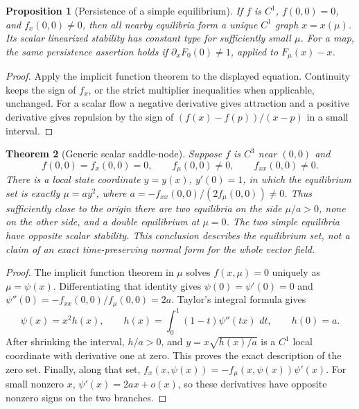\documentclass[11pt,oneside]{book}
\newtheorem{theorem}{Theorem}[chapter]
\newtheorem{proposition}[theorem]{Proposition}
\theoremstyle{definition}
\theoremstyle{remark}\newtheorem{remark}[theorem]{Remark}
\newcommand{\dd}{\,d}\newcommand{\id}{\operatorname{id}}
\begin{document}
\begin{proposition}[Persistence of a simple equilibrium]\label{d13:16:simple-persistence}
If \(f\) is \(C^1\), \(f(0,0)=0\), and \(f_x(0,0)\neq0\), then all nearby
equilibria form a unique \(C^1\) graph \(x=x(\mu)\). Its scalar
linearized stability has constant type for sufficiently small \(\mu\).
For a map, the same persistence assertion holds if
\(\partial_xF_0(0)\neq1\), applied to \(F_\mu(x)-x\).
\end{proposition}
\begin{proof}
Apply the implicit function theorem to the displayed equation.
Continuity keeps the sign of \(f_x\), or the strict multiplier inequalities
when applicable, unchanged. For a scalar flow a negative derivative gives
attraction and a positive derivative gives repulsion by the sign of
\((f(x)-f(p))/(x-p)\) in a small interval.
\end{proof}

\begin{theorem}[Generic scalar saddle-node]\label{d13:16:saddle-node}
Suppose \(f\) is \(C^3\) near \((0,0)\) and
\[
 f(0,0)=f_x(0,0)=0,\qquad f_\mu(0,0)\neq0,\qquad f_{xx}(0,0)\neq0.
\]
There is a local state coordinate \(y=y(x)\), \(y'(0)=1\), in which the
equilibrium set is exactly \(\mu=a y^2\), where
\(a=-f_{xx}(0,0)/(2f_\mu(0,0))\neq0\).
Thus sufficiently close to the origin there are two equilibria on the
side \(\mu/a>0\), none on the other side, and a double equilibrium at
\(\mu=0\). The two simple equilibria have opposite scalar stability.
This conclusion describes the equilibrium set, not a claim of an exact
time-preserving normal form for the whole vector field.
\end{theorem}
\begin{proof}
The implicit function theorem in \(\mu\) solves \(f(x,\mu)=0\) uniquely
as \(\mu=\psi(x)\). Differentiating that identity gives
\(\psi(0)=\psi'(0)=0\) and
\(\psi''(0)=-f_{xx}(0,0)/f_\mu(0,0)=2a\).
Taylor's integral formula gives
\[
 \psi(x)=x^2h(x),\qquad
 h(x)=\int_0^1(1-t)\psi''(tx)\,\dd t,\qquad h(0)=a.
\]
After shrinking the interval, \(h/a>0\), and
\(y=x\sqrt{h(x)/a}\) is a \(C^1\) local coordinate with derivative one
at zero. This proves the exact description of the zero set. Finally,
along that set,
\(f_x(x,\psi(x))=-f_\mu(x,\psi(x))\psi'(x)\).
For small nonzero \(x\), \(\psi'(x)=2ax+o(x)\), so these derivatives
have opposite nonzero signs on the two branches.
\end{proof}
\end{document}
